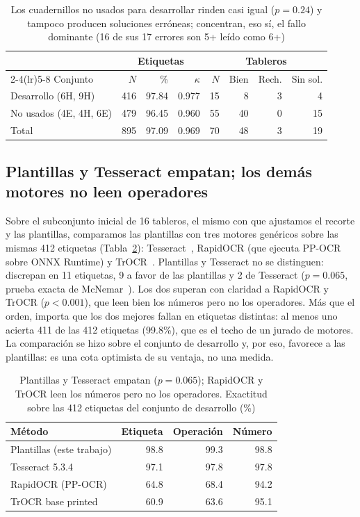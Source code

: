 \documentclass[conference]{IEEEtran}
\begin{document}
\begin{table}[t]
\caption{Los cuadernillos no usados para desarrollar rinden casi igual ($p = 0.24$) y tampoco producen soluciones erróneas; concentran, eso sí, el fallo dominante (16 de sus 17 errores son 5+ leído como 6+)}
\label{tab:split}
\centering
\setlength{\tabcolsep}{3pt}
\begin{tabular}{lrrrrrrr}
\toprule
 & \multicolumn{3}{c}{Etiquetas} & \multicolumn{4}{c}{Tableros} \\
\cmidrule(lr){2-4}\cmidrule(lr){5-8}
Conjunto & $N$ & \% & $\kappa$ & $N$ & Bien & Rech. & Sin sol. \\
\midrule
Desarrollo (6H, 9H) & 416 & 97.84 & 0.977 & 15 & 8 & 3 & 4 \\
No usados (4E, 4H, 6E) & 479 & 96.45 & 0.960 & 55 & 40 & 0 & 15 \\
\midrule
Total & 895 & 97.09 & 0.969 & 70 & 48 & 3 & 19 \\
\bottomrule
\end{tabular}
\end{table}

\subsection{Plantillas y Tesseract empatan; los demás motores no leen operadores}
Sobre el subconjunto inicial de 16 tableros, el mismo con que ajustamos el recorte y las plantillas, comparamos las plantillas con tres motores genéricos sobre las mismas 412 etiquetas (Tabla~\ref{tab:ocr}): Tesseract~\cite{tesseract}, RapidOCR (que ejecuta PP-OCR~\cite{ppocr} sobre ONNX Runtime) y TrOCR~\cite{trocr}. Plantillas y Tesseract no se distinguen: discrepan en 11 etiquetas, 9 a favor de las plantillas y 2 de Tesseract ($p = 0.065$, prueba exacta de McNemar~\cite{mcnemar}). Los dos superan con claridad a RapidOCR y TrOCR ($p < 0.001$), que leen bien los números pero no los operadores. Más que el orden, importa que los dos mejores fallan en etiquetas distintas: al menos uno acierta 411 de las 412 etiquetas (99.8\%), que es el techo de un jurado de motores. La comparación se hizo sobre el conjunto de desarrollo y, por eso, favorece a las plantillas: es una cota optimista de su ventaja, no una medida.

\begin{table}[t]
\caption{Plantillas y Tesseract empatan ($p = 0.065$); RapidOCR y TrOCR leen los números pero no los operadores. Exactitud sobre las 412 etiquetas del conjunto de desarrollo (\%)}
\label{tab:ocr}
\centering
\begin{tabular}{lrrr}
\toprule
Método & Etiqueta & Operación & Número \\
\midrule
Plantillas (este trabajo) & 98.8 & 99.3 & 98.8 \\
Tesseract 5.3.4 & 97.1 & 97.8 & 97.8 \\
RapidOCR (PP-OCR) & 64.8 & 68.4 & 94.2 \\
TrOCR base printed & 60.9 & 63.6 & 95.1 \\
\bottomrule
\end{tabular}
\end{table}
\end{document}
